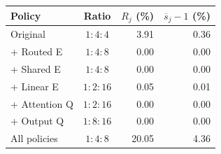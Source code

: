 \begin{tabular}{@{}lcrr@{}}\toprule
Policy & Ratio & $R_j$ (\%) & $\overline{s}_j-1$ (\%) \\\midrule
Original & $1:4:4$ & 3.91 & 0.36 \\
+ Routed E & $1:4:8$ & 0.00 & 0.00 \\
+ Shared E & $1:4:8$ & 0.00 & 0.00 \\
+ Linear E & $1:2:16$ & 0.05 & 0.01 \\
+ Attention Q & $1:2:16$ & 0.00 & 0.00 \\
+ Output Q & $1:8:16$ & 0.00 & 0.00 \\
All policies & $1:4:8$ & 20.05 & 4.36 \\
\bottomrule\end{tabular}
